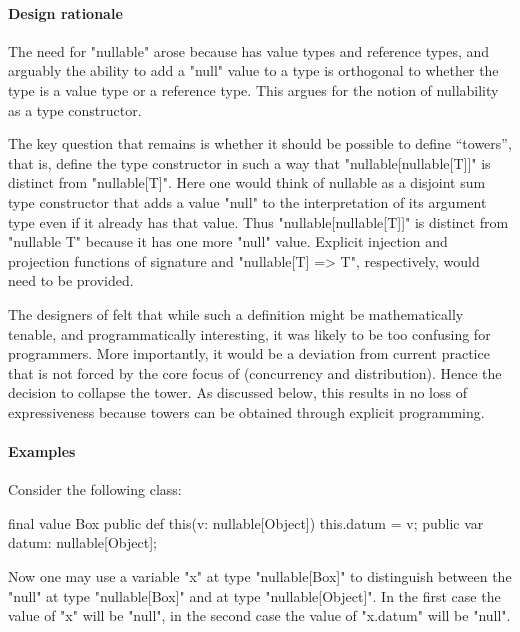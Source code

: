 \paragraph{Design rationale}

The need for \xcd"nullable" arose because \Xten{} has value types and
reference types, and arguably the ability to add a \xcd"null" value to
a type is orthogonal to whether the type is a value type or a
reference type. This argues for the notion of nullability as a type
constructor.

The key question that remains is whether it should be possible to
define ``towers'', that is, define the type constructor in such a way
that \xcd"nullable[nullable[T]]" is distinct from \xcd"nullable[T]". Here
one would think of nullable as a disjoint sum type constructor that
adds a value \xcd"null" to the interpretation of its argument type
even if it already has that value. Thus \xcd"nullable[nullable[T]]" is
distinct from \xcd"nullable T" because it has one more \xcd"null"
value. Explicit injection and projection functions of signature  and \xcd"nullable[T] => T", respectively,
would need to be provided.

The designers of \Xten{} felt that while such a definition might be
mathematically tenable, and programmatically interesting, it was
likely to be too confusing for programmers. More importantly, it would
be a deviation from current practice that is not forced by the core
focus of \Xten{} (concurrency and distribution). Hence the decision to
collapse the tower.  As discussed below, this results in no loss of
expressiveness because towers can be obtained through explicit
programming.

\paragraph{Examples}

Consider the following class:

\begin{xten}
final value Box { 
  public def this(v: nullable[Object]) { this.datum = v; }
  public var datum: nullable[Object];
}
\end{xten}

Now one may use a variable \xcd"x" at type \xcd"nullable[Box]" to
distinguish between the \xcd"null" at type \xcd"nullable[Box]" and at type
\xcd"nullable[Object]". In the first case the value
of \xcd"x" will be \xcd"null", in the second case the value of \xcd"x.datum"
will be \xcd"null".


